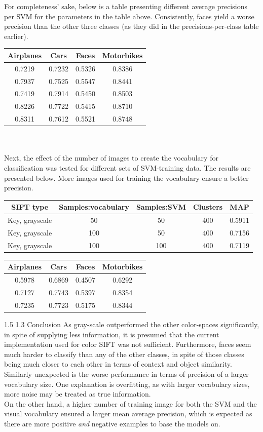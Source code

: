 \documentclass[12pt,a4paper]{amsart}
\makeatletter
\def\section{%
  \@startsection{section}{1}{\z@}%
  {1.5\linespacing\@plus\linespacing}%
  {1.3\linespacing}%
  {\bfseries\normalfont\scshape}
}
\makeatother
\begin{document}
For completeness' sake, below is a table presenting different average precisions per SVM for the parameters in the table above. Consistently, faces yield a worse precision than the other three classes (as they did in the precisions-per-class table earlier).\\
\begin{tabular}{|cccc|}
\hline
Airplanes & Cars & Faces & Motorbikes\\
\toprule
0.7219&0.7232&0.5326&0.8386\\
0.7937&0.7525&0.5547&0.8441 \\
0.7419&0.7914&0.5450&0.8503\\
0.8226&0.7722&0.5415&0.8710\\
0.8311&0.7612&0.5521&0.8748\\
\hline
\end{tabular}
\\\\Next, the effect of the number of images to create the vocabulary for classification was tested for different sets of SVM-training data. The results are presented below. More images used for training the vocabulary ensure a better precision.
\begin{tabular}{|ccccc|}
\hline
SIFT type & Samples:vocabulary & Samples:SVM & Clusters & MAP\\
\toprule
Key, grayscale & 50 & 50 & 400 & 0.5911 \\
Key, grayscale & 100 & 50 & 400 & 0.7156 \\
Key, grayscale & 100 & 100 & 400 & 0.7119 \\
\hline
\end{tabular}

\begin{tabular}{|cccc|}
\hline
Airplanes & Cars & Faces & Motorbikes\\
\toprule
0.5978&0.6869&0.4507&0.6292\\
0.7127& 0.7743& 0.5397 & 0.8354\\
0.7235 & 0.7723& 0.5175 & 0.8344\\
\hline
\end{tabular}
\fi


\section{Conclusion}
As gray-scale outperformed the other color-spaces significantly, in spite of supplying less information, it is presumed that the current implementation used for color SIFT was not sufficient.  Furthermore, faces seem much harder to classify than any of the other classes, in spite of those classes being much closer to each other in terms of context and object similarity. \\
Similarly unexpected is the worse performance in terms of precision of a larger vocabulary size. One explanation is overfitting, as with larger vocabulary sizes, more noise may be treated as true information. \\
On the other hand, a higher number of training image for both the SVM and the visual vocabulary ensured a larger mean average precision, which is expected as there are more positive \textit{and} negative examples to base the models on.
\end{document}
